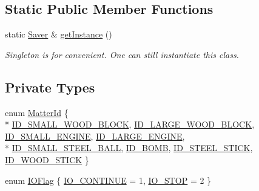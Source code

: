 \subsection*{Static Public Member Functions}
\begin{DoxyCompactItemize}
\item 
static \hyperlink{classSaver}{Saver} \& \hyperlink{classSaver_ae756def2e0ce4c2317b355a9fd12073e}{get\+Instance} ()
\begin{DoxyCompactList}\small\item\em Singleton is for convenient. One can still instantiate this class. \end{DoxyCompactList}\end{DoxyCompactItemize}
\subsection*{Private Types}
\begin{DoxyCompactItemize}
\item 
enum \hyperlink{classSaver_a4b7186206c8281c11545f6f470ce1c4c}{Matter\+Id} \{ \\*
\hyperlink{classSaver_a4b7186206c8281c11545f6f470ce1c4cadc4cb432770173e5dac9033af2b519b5}{I\+D\+\_\+\+S\+M\+A\+L\+L\+\_\+\+W\+O\+O\+D\+\_\+\+B\+L\+O\+C\+K}, 
\hyperlink{classSaver_a4b7186206c8281c11545f6f470ce1c4ca4e4da04edff46f022a7bb5c06be473a5}{I\+D\+\_\+\+L\+A\+R\+G\+E\+\_\+\+W\+O\+O\+D\+\_\+\+B\+L\+O\+C\+K}, 
\hyperlink{classSaver_a4b7186206c8281c11545f6f470ce1c4cab238aa86f5fa92af754fc76f303fdb63}{I\+D\+\_\+\+S\+M\+A\+L\+L\+\_\+\+E\+N\+G\+I\+N\+E}, 
\hyperlink{classSaver_a4b7186206c8281c11545f6f470ce1c4ca0b7a09f49f5c35a317a988bf36424a05}{I\+D\+\_\+\+L\+A\+R\+G\+E\+\_\+\+E\+N\+G\+I\+N\+E}, 
\\*
\hyperlink{classSaver_a4b7186206c8281c11545f6f470ce1c4ca9c3b8fdbfc242fcbafed4ea20d5c70c4}{I\+D\+\_\+\+S\+M\+A\+L\+L\+\_\+\+S\+T\+E\+E\+L\+\_\+\+B\+A\+L\+L}, 
\hyperlink{classSaver_a4b7186206c8281c11545f6f470ce1c4ca20b729a25c2a6d9aff9a60005a223669}{I\+D\+\_\+\+B\+O\+M\+B}, 
\hyperlink{classSaver_a4b7186206c8281c11545f6f470ce1c4cabe5bdd6c6760493c96fb779f2f668e9f}{I\+D\+\_\+\+S\+T\+E\+E\+L\+\_\+\+S\+T\+I\+C\+K}, 
\hyperlink{classSaver_a4b7186206c8281c11545f6f470ce1c4caeb6dd695baa11c27df56be2449764aac}{I\+D\+\_\+\+W\+O\+O\+D\+\_\+\+S\+T\+I\+C\+K}
 \}
\item 
enum \hyperlink{classSaver_a8a4458961f17bff6b74c5371913b96cb}{I\+O\+Flag} \{ \hyperlink{classSaver_a8a4458961f17bff6b74c5371913b96cba95ba68df9b87cd417334814cf93fd64e}{I\+O\+\_\+\+C\+O\+N\+T\+I\+N\+U\+E} = 1, 
\hyperlink{classSaver_a8a4458961f17bff6b74c5371913b96cbaf96071109d6afd5fc6886f7822ee794e}{I\+O\+\_\+\+S\+T\+O\+P} = 2
 \}
\end{DoxyCompactItemize}
